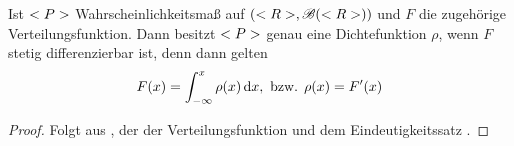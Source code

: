 \begin{conclusion}
	Ist $<P>$ Wahrscheinlichkeitsmaß auf $(<R>, \mathscr{B}(<R>))$ und $F$ die zugehörige Verteilungsfunktion. Dann besitzt $<P>$ genau eine Dichtefunktion $\rho$, wenn $F$ stetig differenzierbar ist, denn dann gelten
	\begin{align}
		F(x) = \int_{-\infty}^{x} \rho(x) \,\mathrm{d} x, \text{ bzw. } \rho(x) = F'(x)\notag
	\end{align}
\end{conclusion}

\begin{proof}
	Folgt aus , der  der Verteilungsfunktion und dem Eindeutigkeitssatz .
\end{proof}